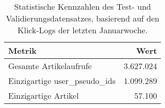 
\begin{table}[htbp]
    \centering
    \caption{Statistische Kennzahlen des Test- und Validierungsdatensatzes, basierend auf den Klick-Logs der letzten Januarwoche.}
    \label{tab:statistiken_test}
    \begin{tabular}{lr}
        \toprule
        \textbf{Metrik} & \textbf{Wert} \\
        \midrule
        Gesamte Artikelaufrufe & 3.627.024 \\
        Einzigartige user\_pseudo\_ids & 1.099.289 \\
        Einzigartige Artikel & 57.100 \\
        \bottomrule
    \end{tabular}
\end{table}